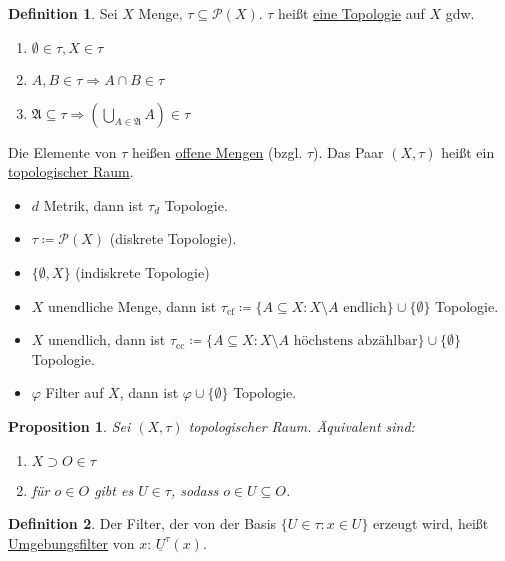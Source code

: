 \documentclass[12pt]{scrartcl}%
\newtheorem{prop}{Proposition}
\theoremstyle{definition}
\newtheorem*{defn}{Definition}
\theoremstyle{remark}
\newcommand{\powerset}{\mathcal{P}}
\newcommand{\implies}{\Rightarrow}
\begin{document}
\begin{defn}
    Sei $X$ Menge, $\tau\subseteq \powerset(X)$. $\tau$ heißt \underline{eine Topologie} auf $X$ gdw.

    \begin{enumerate}[label=(\arabic*)]
        \item $\emptyset\in\tau, X\in\tau$
        \item $A,B\in\tau \implies A\cap B\in \tau$
        \item $\mathfrak{A}\subseteq \tau \implies \left(\bigcup_{A\in\mathfrak{A}} A\right) \in \tau$
    \end{enumerate}

    Die Elemente von $\tau$ heißen \underline{offene Mengen} (bzgl. $\tau$). Das Paar $(X,\tau)$ heißt ein \underline{topologischer Raum}.
\end{defn}

\begin{bsp}
    \begin{itemize}
        \item $d$ Metrik, dann ist $\tau_d$ Topologie.
        \item $\tau\coloneqq \powerset(X)$ (diskrete Topologie).
        \item $\{\emptyset, X\}$ (indiskrete Topologie)
        \item $X$ unendliche Menge, dann ist $\tau_\text{cf}\coloneqq \{ A\subseteq X: X\setminus A \text{ endlich} \} \cup \{\emptyset\}$ Topologie.
        \item $X$ unendlich, dann ist $\tau_\text{cc} \coloneqq \{ A\subseteq X: X\setminus A \text{ höchstens abzählbar}\} \cup \{\emptyset\}$ Topologie.
        \item $\varphi$ Filter auf $X$, dann ist $\varphi\cup \{\emptyset\}$ Topologie.
    \end{itemize}
\end{bsp}

\begin{prop}
    Sei $(X, \tau)$ topologischer Raum. Äquivalent sind:

    \begin{enumerate}[label=(\arabic*)]
        \item $X\supset O\in \tau$
        \item für $o\in O$ gibt es $U\in\tau$, sodass $o\in U\subseteq O$.
    \end{enumerate}
\end{prop}

\begin{defn}
    Der Filter, der von der Basis $\{U\in\tau: x\in U\}$ erzeugt wird, heißt \underline{Umgebungsfilter} von $x$: $\underline{U}^\tau(x)$.
\end{defn}
\end{document}
